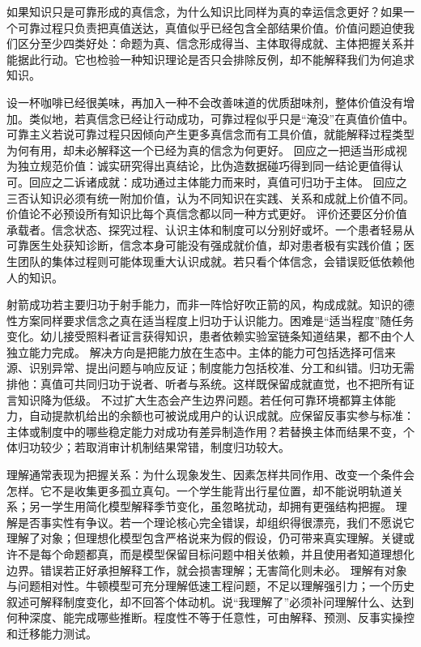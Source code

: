 如果知识只是可靠形成的真信念，为什么知识比同样为真的幸运信念更好？如果一个可靠过程只负责把真值送达，真值似乎已经包含全部结果价值。价值问题迫使我们区分至少四类好处：命题为真、信念形成得当、主体取得成就、主体把握关系并能据此行动。它也检验一种知识理论是否只会排除反例，却不能解释我们为何追求知识。

设一杯咖啡已经很美味，再加入一种不会改善味道的优质甜味剂，整体价值没有增加。类似地，若真信念已经让行动成功，可靠过程似乎只是“淹没”在真值价值中。可靠主义若说可靠过程只因倾向产生更多真信念而有工具价值，就能解释过程类型为何有用，却未必解释这一个已经为真的信念为何更好。 回应之一把适当形成视为独立规范价值：诚实研究得出真结论，比伪造数据碰巧得到同一结论更值得认可。回应之二诉诸成就：成功通过主体能力而来时，真值可归功于主体。\parencite{sosa2007,pritchard2012} 回应之三否认知识必须有统一附加价值，认为不同知识在实践、关系和成就上价值不同。价值论不必预设所有知识比每个真信念都以同一种方式更好。 评价还要区分价值承载者。信念状态、探究过程、认识主体和制度可以分别好或坏。一个患者轻易从可靠医生处获知诊断，信念本身可能没有强成就价值，却对患者极有实践价值；医生团队的集体过程则可能体现重大认识成就。若只看个体信念，会错误贬低依赖他人的知识。

射箭成功若主要归功于射手能力，而非一阵恰好吹正箭的风，构成成就。知识的德性方案同样要求信念之真在适当程度上归功于认识能力。困难是“适当程度”随任务变化。幼儿接受照料者证言获得知识，患者依赖实验室链条知道结果，都不由个人独立能力完成。 解决方向是把能力放在生态中。主体的能力可包括选择可信来源、识别异常、提出问题与响应反证；制度能力包括校准、分工和纠错。归功无需排他：真值可共同归功于说者、听者与系统。这样既保留成就直觉，也不把所有证言知识降为低级。 不过扩大生态会产生边界问题。若任何可靠环境都算主体能力，自动提款机给出的余额也可被说成用户的认识成就。应保留反事实参与标准：主体或制度中的哪些稳定能力对成功有差异制造作用？若替换主体而结果不变，个体归功较少；若取消审计机制结果常错，制度归功较大。

理解通常表现为把握关系：为什么现象发生、因素怎样共同作用、改变一个条件会怎样。它不是收集更多孤立真句。一个学生能背出行星位置，却不能说明轨道关系；另一学生用简化模型解释季节变化，虽忽略扰动，却拥有更强结构把握。\parencite{kvanvig2003,grimm2006} 理解是否事实性有争议。若一个理论核心完全错误，却组织得很漂亮，我们不愿说它理解了对象；但理想化模型包含严格说来为假的假设，仍可带来真实理解。关键或许不是每个命题都真，而是模型保留目标问题中相关依赖，并且使用者知道理想化边界。错误若正好承担解释工作，就会损害理解；无害简化则未必。 理解有对象与问题相对性。牛顿模型可充分理解低速工程问题，不足以理解强引力；一个历史叙述可解释制度变化，却不回答个体动机。说“我理解了”必须补问理解什么、达到何种深度、能完成哪些推断。程度性不等于任意性，可由解释、预测、反事实操控和迁移能力测试。

